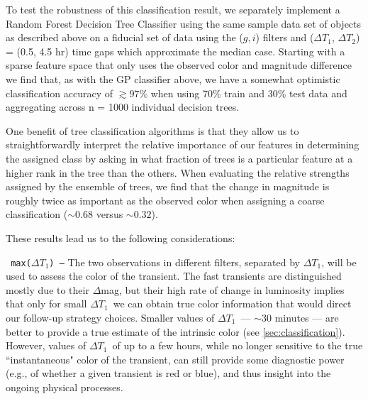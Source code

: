 \documentclass[letterpaper,longauthor,trackchanges,twocolumn,onecolappendix,sort&compress]{aastex62}
\newcommand{\dtone}{\ensuremath{\Delta T_1}}
\newcommand{\dttwo}{\ensuremath{\Delta T_2}}
\begin{document}
To test the robustness of this classification result, we separately implement a Random Forest Decision Tree Classifier \citep[implemented using scikit-learn,][]{scikit-learn} using the same sample data set of objects as described above on a fiducial set of data using the ($g,i$) filters and (\dtone, \dttwo) = (0.5, 4.5 hr) time gaps which approximate the median case.  Starting with a sparse feature space that only uses the observed color and magnitude difference we find that, as with the GP classifier above, we have a somewhat optimistic classification accuracy of $\gtrsim 97\%$ when using 70\% train and 30\% test data and aggregating across n = 1000 individual decision trees.  

One benefit of tree classification algorithms is that they allow us to straightforwardly interpret the relative importance of our features in determining the assigned class by asking in what fraction of trees is a particular feature at a higher rank in the tree than the others.  When evaluating the relative strengths assigned by the ensemble of trees, we find that the change in magnitude is roughly twice as important as the observed color when assigning a coarse classification ($\sim 0.68$ versus $\sim 0.32$).  

These results lead us to the following considerations:


{\tt { max(\dtone) ---}} The two observations in different filters, separated by \dtone, will be used to assess the color of the transient. 
The fast transients are distinguished mostly due to their $\Delta$mag, but their high rate of change in luminosity implies that only for small \dtone\ we can obtain true color information that would direct our follow-up strategy choices.
Smaller values of \dtone\ --- $\sim$30 minutes --- are better to provide a true estimate of the intrinsic color (see \autoref{sec:classification}). However, values of \dtone\ of up to a few hours, while no longer sensitive to the true ``instantaneous" color of the transient, can still provide some diagnostic power (e.g., of whether a given transient is red or blue), and thus insight into the ongoing physical processes. 

\end{document}

